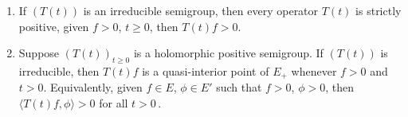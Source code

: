 \begin{theorem}\label{thm:c3-3.2}
	\begin{enumerate}[\upshape (i)]
	\item
 	If $(T(t))$ is an irreducible semigroup, then every operator $T(t)$ is strictly positive, \ie 
	given $f > 0$, $t \geq 0$, then $T(t)f > 0$.
	
	\item 
	Suppose $(T(t))_{t\geq 0}$ is a holomorphic positive semigroup.
	If $(T(t))$ is irreducible, then $T(t)f$ is a quasi-interior point of $E_{+}$ whenever $f > 0$ and $t > 0$.
	Equivalently, given $f \in E$, $\phi \in E'$ such that $f > 0$, $\phi > 0$, then $\langle T(t)f,\phi \rangle > 0$ for all $t > 0$\,.
	\end{enumerate}
\end{theorem}

